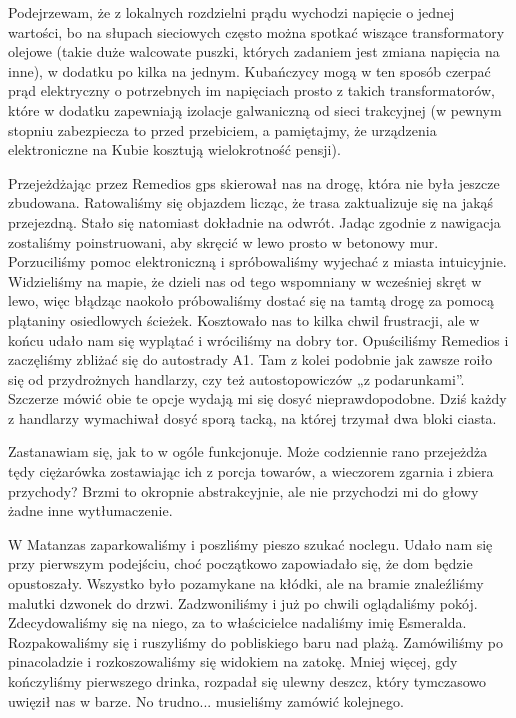 Podejrzewam, że z lokalnych rozdzielni prądu wychodzi napięcie o jednej wartości, bo na słupach sieciowych często można spotkać wiszące transformatory olejowe (takie duże walcowate puszki, których zadaniem jest zmiana napięcia na inne), w dodatku po kilka na jednym.
Kubańczycy mogą w ten sposób czerpać prąd elektryczny o potrzebnych im napięciach prosto z takich transformatorów, które w dodatku zapewniają izolacje galwaniczną od sieci trakcyjnej (w pewnym stopniu zabezpiecza to przed przebiciem, a pamiętajmy, że urządzenia elektroniczne na Kubie kosztują wielokrotność pensji).
\par Przejeżdżając przez Remedios gps skierował nas na drogę, która nie była jeszcze zbudowana.
Ratowaliśmy się objazdem licząc, że trasa zaktualizuje się na jakąś przejezdną.
Stało się natomiast dokładnie na odwrót.
Jadąc zgodnie z nawigacja zostaliśmy poinstruowani, aby skręcić w lewo prosto w betonowy mur.
Porzuciliśmy pomoc elektroniczną i spróbowaliśmy wyjechać z miasta intuicyjnie.
Widzieliśmy na mapie, że dzieli nas od tego wspomniany w wcześniej skręt w lewo, więc błądząc naokoło próbowaliśmy dostać się na tamtą drogę za pomocą plątaniny osiedlowych ścieżek.
Kosztowało nas to kilka chwil frustracji, ale w końcu udało nam się wyplątać i wróciliśmy na dobry tor.
Opuściliśmy Remedios i zaczęliśmy zbliżać się do autostrady A1.
Tam z kolei podobnie jak zawsze roiło się od przydrożnych handlarzy, czy też autostopowiczów „z podarunkami”.
Szczerze mówić obie te opcje wydają mi się dosyć nieprawdopodobne.
Dziś każdy z handlarzy wymachiwał dosyć sporą tacką, na której trzymał dwa bloki ciasta.

\noindent Zastanawiam się, jak to w ogóle funkcjonuje.
Może codziennie rano przejeżdża tędy ciężarówka zostawiając ich z porcja towarów, a wieczorem zgarnia i zbiera przychody?
Brzmi to okropnie abstrakcyjnie, ale nie przychodzi mi do głowy żadne inne wytłumaczenie.
\par W Matanzas zaparkowaliśmy i poszliśmy pieszo szukać noclegu.
Udało nam się przy pierwszym podejściu, choć początkowo zapowiadało się, że dom będzie opustoszały.
Wszystko było pozamykane na kłódki, ale na bramie znaleźliśmy malutki dzwonek do drzwi.
Zadzwoniliśmy i już po chwili oglądaliśmy pokój.
Zdecydowaliśmy się na niego, za to właścicielce nadaliśmy imię Esmeralda.
Rozpakowaliśmy się i ruszyliśmy do pobliskiego baru nad plażą.
Zamówiliśmy po pinacoladzie i rozkoszowaliśmy się widokiem na zatokę.
Mniej więcej, gdy kończyliśmy pierwszego drinka, rozpadał się ulewny deszcz, który tymczasowo uwięził nas w barze.
No trudno...
musieliśmy zamówić kolejnego.